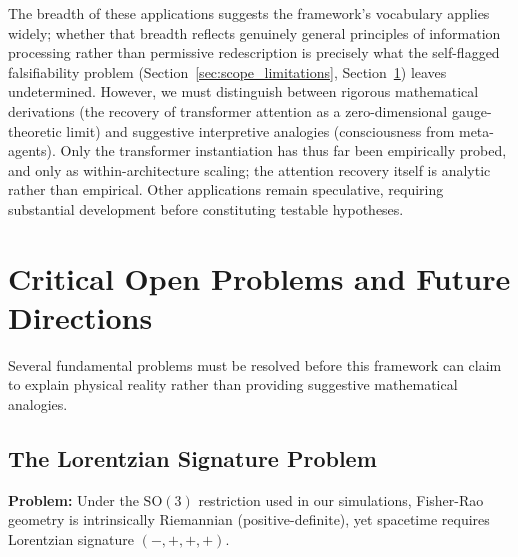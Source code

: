\documentclass[11pt]{article}
\begin{document}
The breadth of these applications suggests the framework's vocabulary applies widely; whether that breadth reflects genuinely general principles of information processing rather than permissive redescription is precisely what the self-flagged falsifiability problem (Section~\ref{sec:scope_limitations}, Section~\ref{sec:open_problems}) leaves undetermined. However, we must distinguish between rigorous mathematical derivations (the recovery of transformer attention as a zero-dimensional gauge-theoretic limit) and suggestive interpretive analogies (consciousness from meta-agents). Only the transformer instantiation has thus far been empirically probed, and only as within-architecture scaling; the attention recovery itself is analytic rather than empirical. Other applications remain speculative, requiring substantial development before constituting testable hypotheses.

\section{Critical Open Problems and Future Directions}
\label{sec:open_problems}

Several fundamental problems must be resolved before this framework can claim to explain physical reality rather than providing suggestive mathematical analogies.

\subsection{The Lorentzian Signature Problem}

\textbf{Problem:} Under the $\mathrm{SO}(3)$ restriction used in our simulations, Fisher-Rao geometry is intrinsically Riemannian (positive-definite), yet spacetime requires Lorentzian signature $(-,+,+,+)$.
\end{document}
